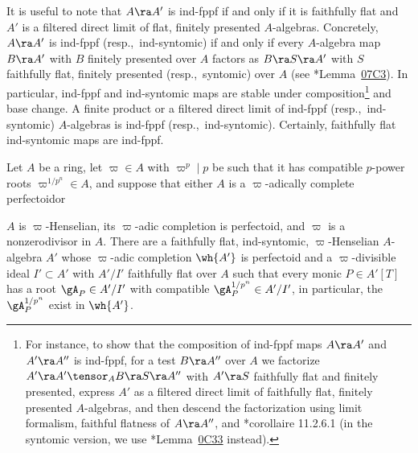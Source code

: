 It is useful to note that $A \ra A'$ is ind-fppf if and only if it is faithfully flat and $A'$ is a filtered direct limit of flat, finitely presented $A$-algebras. Concretely, $A \ra A'$ is ind-fppf (resp.,~ind-syntomic) if and only if every $A$-algebra map $B \ra A'$ with $B$ finitely presented over $A$ factors as $B \ra S \ra A'$ with $S$ faithfully flat, finitely presented (resp.,~syntomic) over $A$ (see \cite{SP}*{Lemma~\href{https://stacks.math.columbia.edu/tag/07C3}{07C3}}). In particular, ind-fppf and ind-syntomic maps are stable under composition\footnote{For instance, to show that the composition of ind-fppf maps $A \ra A'$ and $A' \ra A''$ is ind-fppf, %
for a test $B \ra A''$ over $A$ we factorize $A' \ra A' \tensor_A B \ra S \ra A''$ with $A' \ra S$ faithfully flat and finitely presented, express $A'$ as a filtered direct limit of faithfully flat, finitely presented $A$-algebras, and then descend the factorization using limit formalism, faithful flatness of $A \ra A''$, and \cite{EGAIV3}*{corollaire 11.2.6.1} (in the syntomic version, we use \cite{SP}*{Lemma~\href{https://stacks.math.columbia.edu/tag/0C33}{0C33}} instead).} %
and base change. A finite product or a  filtered direct limit of ind-fppf (resp.,~ind-syntomic) $A$-algebras is ind-fppf (resp.,~ind-syntomic). Certainly, faithfully flat ind-syntomic maps are ind-fppf.
\epp



\bthm \label{Andre-lem}
Let $A$ be a ring, let $\varpi \in A$ with $\varpi^p \mid p$ be such that it has compatible $p$-power roots $\varpi^{1/p^n} \in A$, and suppose that either %
\benumr
\m {}
$A$ is a $\varpi$-adically complete perfectoid\uscolon or

\m {}
$A$ is $\varpi$-Henselian, its $\varpi$-adic completion is perfectoid, and $\varpi$ is a nonzerodivisor in $A$.
\eenum
There are a faithfully flat, ind-syntomic, %
$\varpi$-Henselian $A$-algebra $A'$ whose $\varpi$-adic completion $\wh{A'}$ is perfectoid and a $\varpi$-divisible ideal $I' \subset A'$ with $A'/I'$ faithfully flat over $A$ such that every monic $P \in A'[T]$ has a root $\gA_P \in A'/I'$ with compatible $\gA_P^{1/p^n} \in A'/I'$,
in particular, the $\gA_P^{1/p^n}$ exist in %
$\wh{A'}$. %
\ethm


